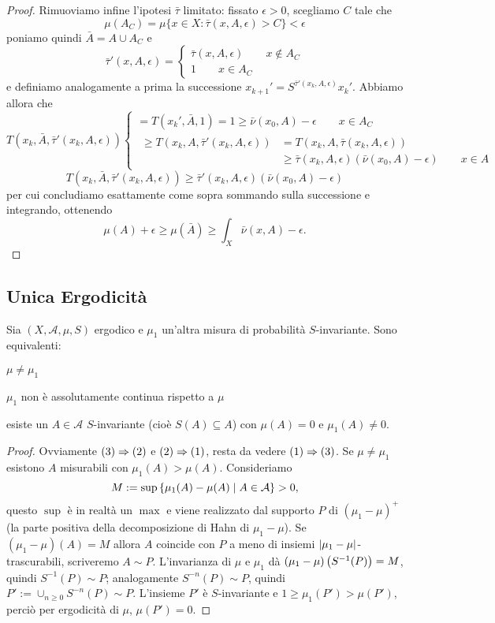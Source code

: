 \begin{proof}
Rimuoviamo infine l'ipotesi $\bar\tau$ limitato: fissato $\epsilon>0$, scegliamo $C$ tale che
\[\mu(A_C)=\mu\{x\in X: \bar\tau(x,A,\epsilon)>C\}<\epsilon\]
poniamo quindi $\bar A=A\cup A_C$ e
\[\bar\tau'(x,A,\epsilon)=\begin{cases}\bar\tau(x,A,\epsilon) \qquad x\notin A_C\\
					1 \qquad x\in A_C
  \end{cases}\]
e definiamo analogamente a prima la successione $x_{k+1}'=S^{\bar\tau'(x_k,A,\epsilon)}x_k'$. Abbiamo allora che
\[T(x_k,\bar A,\bar\tau'(x_k,A,\epsilon))
    \begin{cases} =T(x_k',\bar A,1)=1\geq \bar\nu(x_0,A)-\epsilon \qquad x\in A_C \\
		  \begin{split}\geq T(x_k,A,\bar\tau'(x_k,A,\epsilon))&=T(x_k,A,\bar\tau(x_k,A,\epsilon))\\
			&\geq \bar\tau(x_k,A,\epsilon)(\bar\nu(x_0,A)-\epsilon) \qquad x\in A \end{split}
    \end{cases}\]
\[T(x_k,\bar A,\bar\tau'(x_k,A,\epsilon))\geq \bar\tau'(x_k,A,\epsilon)(\bar\nu(x_0,A)-\epsilon)\]
per cui concludiamo esattamente come sopra sommando sulla successione e integrando, ottenendo
\[\mu(A)+\epsilon\geq\mu(\bar A)\geq \int_X \bar\nu(x,A)-\epsilon.\]
\end{proof}

\subsection{Unica Ergodicità}

\begin{teo}Sia $(X,\mathcal{A},\mu,S)$ ergodico e $\mu_1$ un'altra misura di probabilità $S$-invariante.
Sono equivalenti:
\begin{lista}
\item $\mu\neq\mu_1$
\item $\mu_1$ non è assolutamente continua rispetto a $\mu$
\item esiste un $A\in\mathcal{A}$ $S$-invariante (cioè $S(A)\subseteq A$) con $\mu(A)=0$ e $\mu_1(A)\neq 0$.
\end{lista}
\end{teo}

\begin{proof}Ovviamente $(3)\Rightarrow (2)$ e $(2)\Rightarrow (1)$, resta da vedere $(1)\Rightarrow (3)$.
Se $\mu\neq\mu_1$ esistono $A$ misurabili con $\mu_1(A)>\mu(A)$. Consideriamo 
\[M:=\sup\left\{\mu_1(A)-\mu(A)\mid A\in\mathcal{A}\right\}>0,\]
questo $\sup$ è in realtà un $\max$ e viene realizzato dal supporto $P$ di $(\mu_1-\mu)^+$ (la parte positiva della decomposizione di Hahn di $\mu_1-\mu$). 
Se $(\mu_1-\mu)(A)=M$ allora $A$ coincide con $P$ a meno di insiemi $\left|\mu_1-\mu\right|$-trascurabili, scriveremo $A\sim P$.
L'invarianza di $\mu$ e $\mu_1$ dà $(\mu_1-\mu)\left(S^{-1}(P)\right)=M$, quindi $S^{-1}(P)\sim P$; analogamente $S^{-n}(P)\sim P$,
quindi $P':=\cup_{n\ge 0}S^{-n}(P)\sim P$. L'insieme $P'$ è $S$-invariante e $1\ge \mu_1(P')>\mu(P')$, perciò per ergodicità di $\mu$, $\mu(P')=0$.
\end{proof}

